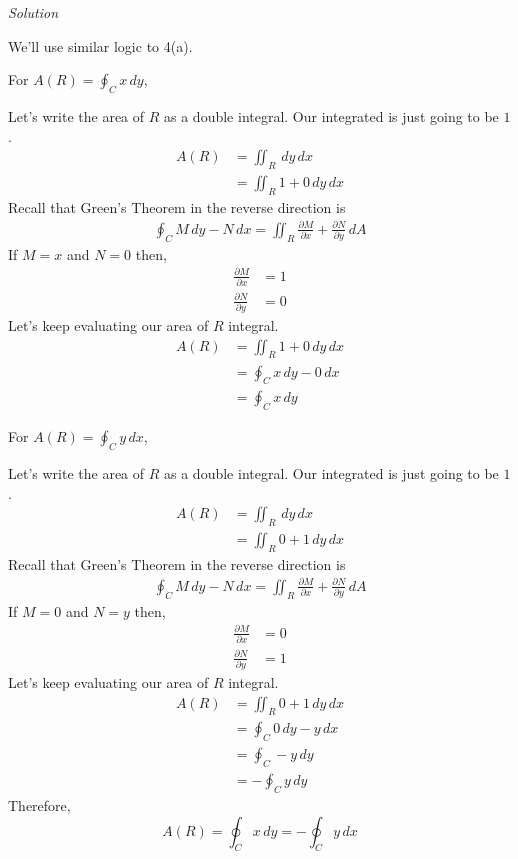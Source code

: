 \documentclass{article}
\newcommand{\Solution}{\textit{Solution}}
\begin{document}
\Solution

We'll use similar logic to 4(a).

{} For $\displaystyle A(R)=\oint_C x\,dy$,

Let's write the area of $R$ as a double integral. Our integrated is just going to be $1$.
\begin{align*}
    A(R)&=\iint_R \,dy\,dx\\
    &=\iint_R 1 +0\,dy\,dx\tag{$1+0=1$}
\end{align*}
Recall that Green's Theorem in the reverse direction is
\begin{align*}
     \oint_C M\,dy - N\,dx = \iint_R \frac{\partial M}{\partial x} + \frac{\partial N}{\partial y}\,dA\tag{yes, this is like flux}
\end{align*}
If $\displaystyle M=x$ and $\displaystyle N=0$ then,
\begin{align*}
\frac{\partial M}{\partial x}&=1\\
\frac{\partial N}{\partial y}&=0
\end{align*}
Let's keep evaluating our area of $R$ integral.
\begin{align*}
    A(R)&=\iint_R 1+0\,dy\,dx\\
    &=\oint_C x\,dy - 0\,dx\tag{Green's Theorem}\\
    &=\oint_C x\,dy
\end{align*}

{} For $\displaystyle A(R)=\oint_C y\,dx$,

Let's write the area of $R$ as a double integral. Our integrated is just going to be $1$.
\begin{align*}
    A(R)&=\iint_R \,dy\,dx\\
    &=\iint_R 0 +1\,dy\,dx\tag{$0+1=1$}
\end{align*}
Recall that Green's Theorem in the reverse direction is
\begin{align*}
     \oint_C M\,dy - N\,dx = \iint_R \frac{\partial M}{\partial x} + \frac{\partial N}{\partial y}\,dA\tag{yes, this is like flux}
\end{align*}
If $\displaystyle M=0$ and $\displaystyle N=y$ then,
\begin{align*}
\frac{\partial M}{\partial x}&=0\\
\frac{\partial N}{\partial y}&=1
\end{align*}
Let's keep evaluating our area of $R$ integral.
\begin{align*}
    A(R)&=\iint_R 0+1\,dy\,dx\\
    &=\oint_C 0\,dy - y\,dx\tag{Green's Theorem}\\
    &=\oint_C -y\,dy\\
    &=-\oint_C y\,dy
\end{align*}
Therefore,
\begin{equation*}
    A(R)=\oint_C x\,dy=-\oint_C y\,dx
\end{equation*}
\end{document}
